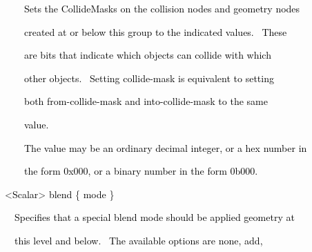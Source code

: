 \documentclass[a4paper]{article}
\newcommand\textstyleOOoComputerKeyWord[1]{\textrm{\textcolor[rgb]{0.0,0.0,0.5019608}{#1}}}
\newcommand\textstyleOOoAssemblerSpecialChar[1]{\textrm{\textcolor[rgb]{0.0,0.5019608,0.0}{#1}}}
\newcommand\textstyleOOoAssemblerIdent[1]{\textrm{\textcolor{black}{#1}}}
\begin{document}
\bigskip

{\color{black}
\textstyleOOoComputerKeyWord{\textcolor{black}{\ \ \ \ \ \ Sets the CollideMasks on the collision nodes and geometry
nodes}}}

{\color{black}
\textstyleOOoComputerKeyWord{\textcolor{black}{\ \ \ \ \ \ created at or below this group to the indicated values.
\ These}}}

{\color{black}
\textstyleOOoComputerKeyWord{\textcolor{black}{\ \ \ \ \ \ are bits that indicate which objects can collide with
which}}}

{\color{black}
\textstyleOOoComputerKeyWord{\textcolor{black}{\ \ \ \ \ \ other objects. \ Setting
{\textquotedbl}collide-mask{\textquotedbl} is equivalent to setting}}}

{\color{black}
\textstyleOOoComputerKeyWord{\textcolor{black}{\ \ \ \ \ \ both {\textquotedbl}from-collide-mask{\textquotedbl} and
{\textquotedbl}into-collide-mask{\textquotedbl} to the same}}}

{\color{black}
\textstyleOOoComputerKeyWord{\textcolor{black}{\ \ \ \ \ \ value.}}}


\bigskip

{\color{black}
\textstyleOOoComputerKeyWord{\textcolor{black}{\ \ \ \ \ \ The value may be an ordinary decimal integer, or a hex number
in}}}

{\color{black}
\textstyleOOoComputerKeyWord{\textcolor{black}{\ \ \ \ \ \ the form 0x000, or a binary number in the form 0b000.}}}


\bigskip

{\color{black}
\textstyleOOoComputerKeyWord{\textcolor{black}{\ \ }}\textstyleOOoAssemblerSpecialChar{{\textless}}\textstyleOOoAssemblerIdent{Scalar}\textstyleOOoAssemblerSpecialChar{{\textgreater}}\textstyleOOoComputerKeyWord{\textcolor{black}{
}}\textstyleOOoAssemblerIdent{blend}\textstyleOOoComputerKeyWord{\textcolor{black}{
}}\textstyleOOoAssemblerSpecialChar{\{}\textstyleOOoComputerKeyWord{\textcolor{black}{
}}\textstyleOOoAssemblerIdent{mode}\textstyleOOoComputerKeyWord{\textcolor{black}{
}}\textstyleOOoAssemblerSpecialChar{\}}}


\bigskip

{\color{black}
\textstyleOOoComputerKeyWord{\textcolor{black}{\ \ \ \ Specifies that a special blend mode should be applied geometry
at}}}

{\color{black}
\textstyleOOoComputerKeyWord{\textcolor{black}{\ \ \ \ this level and below. \ The available options are none, add,}}}
\end{document}

